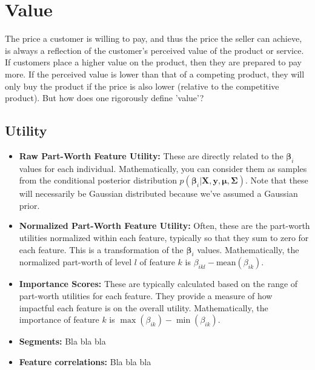 \documentclass{article}
\begin{document}
\section{Value}

The price a customer is willing to pay, and thus the price the seller can achieve, is always a reflection of the customer’s perceived value of the product or service. If customers place a higher value on the product, then they are prepared to pay more. If the perceived value is lower than that of a competing product, they will only buy the product if the price is also lower (relative to the competitive product). But how does one rigorously define 'value'?


\subsection{Utility}

\begin{itemize}
    \item \textbf{Raw Part-Worth Feature Utility:} These are directly related to the \( \boldsymbol{\beta}_{i} \) values for each individual. Mathematically, you can consider them as samples from the conditional posterior distribution \( p(\boldsymbol{\beta}_i | \mathbf{X}, \mathbf{y}, \boldsymbol{\mu}, \boldsymbol{\Sigma}) \). Note that these will necessarily be Gaussian distributed because we've assumed a Gaussian prior. 
    
    \item \textbf{Normalized Part-Worth Feature Utility:} Often, these are the part-worth utilities normalized within each feature, typically so that they sum to zero for each feature. This is a transformation of the \( \boldsymbol{\beta}_{i} \) values. Mathematically, the normalized part-worth of level \( l \) of feature \( k \) is \( \beta_{ikl} - \text{mean}(\beta_{ik}) \).
    
    \item \textbf{Importance Scores:} These are typically calculated based on the range of part-worth utilities for each feature. They provide a measure of how impactful each feature is on the overall utility. Mathematically, the importance of feature \( k \) is \( \max(\beta_{ik}) - \min(\beta_{ik}) \).

     \item \textbf{Segments:} Bla bla bla

  \item \textbf{Feature correlations:} Bla bla bla
\end{itemize}
\end{document}
